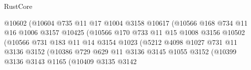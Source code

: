 \begin{lexlean}{RustCore}
\begin{coremodule}
                                    @10602
                                    (@10604
                                      @735
                                      @11
                                      @17
                                      @1004
                                      @3158
                                      @10617
                                      (@10566
                                        @168
                                        @734
                                        @11
                                        @16
                                        @1006
                                        @3157
                                        @10425
                                        (@10566
                                          @170
                                          @733
                                          @11
                                          @15
                                          @1008
                                          @3156
                                          @10502
                                          (@10566
                                            @731
                                            @183
                                            @11
                                            @14
                                            @3154
                                            @1023
                                            (@5212
                                              @4098
                                              @1027
                                              @731
                                              @11
                                              @3136
                                              @3152
                                              (@10386
                                                @729
                                                @629
                                                @11
                                                @3136
                                                @3145
                                                @1055
                                                @3152
                                                (@10399
                                                  @3136
                                                  @3143
                                                  @1165
                                                  (@10409
                                                    @3135
                                                    @3142

\end{coremodule}
\end{lexlean}
